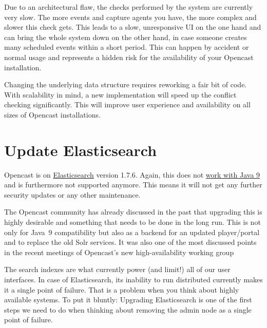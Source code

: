 \documentclass[a4paper]{article}
\begin{document}
Due to an architectural flaw, the checks performed by the system are
currently very slow. The more events and capture agents you have, the
more complex and slower this check gets. This leads to a slow,
unresponsive UI on the one hand and can bring the whole system down on
the other hand, in case someone creates many scheduled events within a
short period. This can happen by accident or normal usage and
represents a hidden risk for the availability of your Opencast
installation.

Changing the underlying data structure requires reworking a fair bit of
code. With scalability in mind, a new implementation will speed up the
conflict checking significantly. This will improve user experience and
availability on all sizes of Opencast installations.


\section*{Update Elasticsearch}

Opencast is on
\href{https://www.elastic.co/products/elasticsearch}{Elasticsearch} version
1.7.6. Again, this does not
\href{https://www.elastic.co/support/matrix#matrix_jvm}{work with Java 9} and
is furthermore not supported anymore. This means it will not get any further
security updates or any other maintenance.

The Opencast community has already discussed in the past that upgrading
this is highly desirable and something that needs to be done in the
long run. This is not only for Java~9 compatibility but also as a
backend for an updated player/portal and to replace the old Solr
services. It was also one of the most discussed points in the recent
meetings of Opencast's new high-availability working group

The search indexes are what currently power (and limit!) all of our
user interfaces. In case of Elasticsearch, its inability to run
distributed currently makes it a single point of failure. That is a
problem when you think about highly available systems. To put it
bluntly: Upgrading Elasticsearch is one of the first steps we need to
do when thinking about removing the admin node as a single point of
failure.
\end{document}
